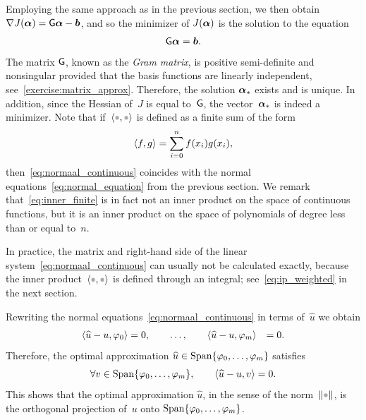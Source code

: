 Employing the same approach as in the previous section,
we then obtain $\nabla J(\mathbf{\boldsymbol{\alpha}}) = \mathsf G \mathbf{\boldsymbol{\alpha}} - \mathbf{\boldsymbol{b}}$,
and so the minimizer of $J(\mathbf{\boldsymbol{\alpha}})$ is the solution to the equation
\begin{equation}
    \label{eq:normaal_continuous}
    \mathsf G \mathbf{\boldsymbol{\alpha}} = \mathbf{\boldsymbol{b}}.
\end{equation}
The matrix $\mathsf G$,
known as the \emph{Gram matrix},
is positive semi-definite and nonsingular provided that the basis functions are linearly independent,
see~\cref{exercise:matrix_approx}.
Therefore, the solution $\mathbf{\boldsymbol{\alpha}}_*$ exists and is unique.
In addition, since the Hessian of~$J$ is equal to~$\mathsf G$,
the vector~$\mathbf{\boldsymbol{\alpha}}_*$ is indeed a minimizer.
Note that if~$\ip{\placeholder,\placeholder}$ is defined as a finite sum of the form
\begin{equation}
    \label{eq:inner_finite}
    \langle f, g\rangle = \sum_{i=0}^{n} f(x_i) g(x_i),
\end{equation}
then~\eqref{eq:normaal_continuous} coincides with the normal equations~\eqref{eq:normal_equation} from the previous section.
We remark that~\eqref{eq:inner_finite} is in fact not an inner product on the space of continuous functions,
but it is an inner product on the space of polynomials of degree less than or equal to~$n$.

In practice, the matrix and right-hand side of the linear system~\eqref{eq:normaal_continuous} can usually not be calculated exactly,
because the inner product~$\ip{\placeholder,\placeholder}$ is defined through an integral; see~\eqref{eq:ip_weighted} in the next section.

\begin{remark}
    Rewriting the normal equations~\eqref{eq:normaal_continuous} in terms of~$\widehat u$
    we obtain
    \begin{align*}
        \langle\widehat u - u,\varphi_0\rangle &= 0,
        \qquad
        \dots, \qquad
        \langle\widehat u - u,\varphi_m\rangle &= 0.
    \end{align*}
    Therefore, the optimal approximation $\widehat u \in \operatorname{Span} \{ \varphi_0, \dotsc, \varphi_m \}$ satisfies
    \[
        \forall v \in \operatorname{Span} \{ \varphi_0, \dotsc, \varphi_m \}, \qquad \langle\widehat u - u, v\rangle = 0.
    \]
    This shows that the optimal approximation $\widehat u$,
    in the sense of the norm~$\norm{\placeholder}$,
    is the orthogonal projection of~$u$ onto $\operatorname{Span} \{ \varphi_0, \dotsc, \varphi_m \}$.
\end{remark}
